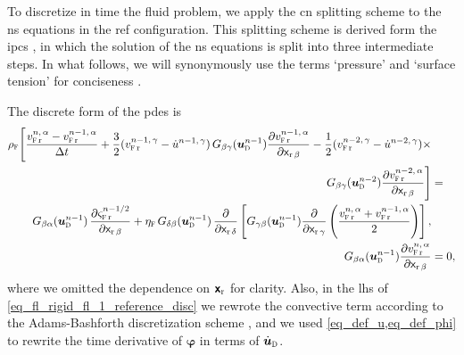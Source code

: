To discretize in time the fluid problem, we  apply the \ac{cn} splitting scheme \cite{loggAutomatedSolutionDifferential2012,crankPracticalMethodNumerical1947} to the \ac{ns} equations  in the \ac{ref} configuration. This splitting scheme is derived form the \ac{ipcs} \cite{godaMultistepTechniqueImplicit1979}, in which the solution of the \ac{ns} equations is split into three intermediate steps. In what follows, we will synonymously use the terms `pressure' and `surface tension'  for conciseness \cite{worthmullerIRENEFluIdLayeR2025}.

The discrete form of the \acp{pde}  is
\bw
\begin{align}
        \label{eq_fl_rigid_fl_1_reference_disc}
        \rhof \Bigg[  \frac{\vfr{n, \, \alpha} - \vfr{n-1,\, \alpha}}{\deltat} + \frac{3}{2} ( \vfr{n-1,\, \gamma}  -  \dot{u}^{n-1,\, \gamma}) \, G_{\beta \gamma}(\budom^{n-1}) \frac{\partial  \vfr{n-1, \, \alpha}}{\partial \xr[\beta]} -
        \frac{1}{2} ( \vfr{n-2,\, \gamma}  -  \dot{u}^{n-2,\, \gamma}) \times                                                                                                                                                                                                                                                              & \newlinenn
        G_{\beta \gamma}(\budom^{n-2}) \frac{\partial  \vfr{n-2, \, \alpha}}{\partial \xr[\beta]} \Bigg]                                                                                                                                                                                                                                   & =              \newlinenn
        G_{\beta \alpha}(\budom^{n-1})  \,          \pderr{ \sigmafr{\nmhalf}   }{\beta }                + \etaf \,              G_{\delta \beta}(\budom^{n-1})            \,         \pderr{}{\delta} \left[  G_{\gamma \beta}(\budom^{n-1}) \pderr{ }{\gamma}\left(\frac{\vfr{n, \, \alpha} + \vfr{n-1, \, \alpha}}{2}\right)   \right], &                           \\
        \label{eq_fl_rigid_fl_2_reference_disc}
        G_{\beta \alpha}(\budom^{n-1}) \pderr{ \vfr{n,\, \alpha}}{\beta}                                                                                                                                                                                                                                                                   & = 0,
\end{align}
\ew
where we omitted the dependence on ${\bm{{\mathsf{x}}}_{\textrm{r}}}$ for clarity. Also, in  the \ac{lhs} of \cref{eq_fl_rigid_fl_1_reference_disc} we rewrote the convective term  according to the Adams-Bashforth  discretization scheme \cite{SolvingOrdinaryDifferential1993,loggAutomatedSolutionDifferential2012}, and we used \cref{eq_def_u,eq_def_phi} to rewrite the time derivative of $\bm \varphi$ in terms of $\budomdot$.

